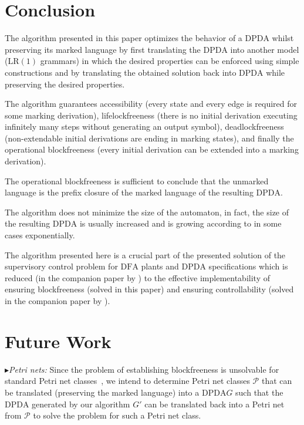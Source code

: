 \documentclass[draft]{ifacconf}
\newcommand{\LR}[1][1]{\ensuremath{\mathrm{LR}(#1)}\xspace}
\newcommand{\DFA}{\ensuremath{\mathrm{DFA}}\xspace}
\newcommand{\DPDA}{\ensuremath{\mathrm{DPDA}}\xspace}
\newcommand{\myparagraph}[1]{\par$\blacktriangleright$\emph{#1:}}
\begin{document}
\section{Conclusion}\label{sect:SUM}
The algorithm presented in this paper optimizes the behavior of a \DPDA whilst preserving its marked language by first translating the \DPDA into another model (\LR grammars) in which the desired properties can be enforced using simple constructions and by translating the obtained solution back into \DPDA while preserving the desired properties.

The algorithm guarantees accessibility (every state and every edge is required for some marking derivation), lifelockfreeness (there is no initial derivation executing infinitely many steps without generating an output symbol), deadlockfreeness (non-extendable initial derivations are ending in marking states), and finally the operational blockfreeness (every initial derivation can be extended into a marking derivation).

The operational blockfreeness is sufficient to conclude that the unmarked language is the prefix closure of the marked language of the resulting \DPDA.

The algorithm does not minimize the size of the automaton, in fact, the size of the resulting \DPDA is usually increased and is growing according to \cite{DBLP:conf/focs/GellerHSU75} in some cases exponentially.

The algorithm presented here is a crucial part of the presented solution of the supervisory control problem for \DFA plants and \DPDA specifications which is reduced (in the companion paper by \citet*{SchneiderSchmuck2014}) to the effective implementability of ensuring blockfreeness (solved in this paper) and ensuring controllability (solved in the companion paper by \citet*{SchmuckSchneider2014}).

\section{Future Work}\label{sect:FUTURE}
\myparagraph{Petri nets}
Since the problem of establishing blockfreeness is unsolvable for standard Petri net classes~\citep{GiuaCesare1994,GiuaCesare1995}, we intend to determine Petri net classes $\mathcal{P}$ that can be translated (preserving the marked language) into a \DPDA $G$ such that the \DPDA generated by our algorithm $G'$ can be translated back into a Petri net from $\mathcal{P}$ to solve the problem for such a Petri net class.
\end{document}
